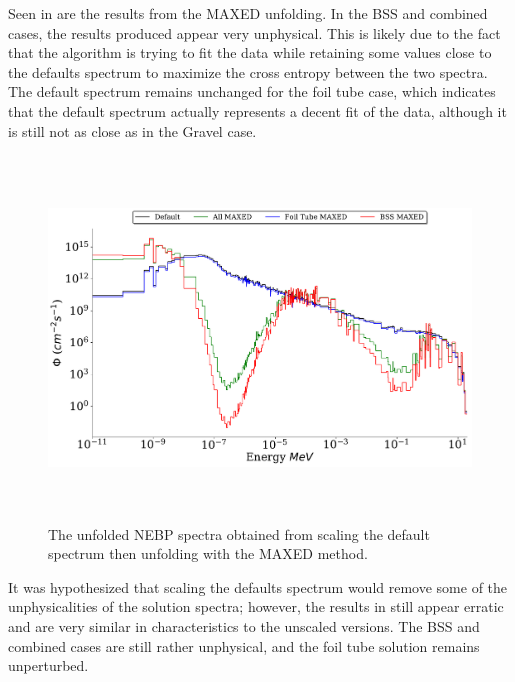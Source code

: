 Seen in  are the results from the MAXED unfolding.
In the BSS and combined cases, the results produced appear very unphysical.
This is likely due to the fact that the algorithm is trying to fit the data while retaining some values close to the defaults spectrum to maximize the cross entropy between the two spectra.
The default spectrum remains unchanged for the foil tube case, which indicates that the default spectrum actually represents a decent fit of the data, although it is still not as close as in the Gravel case.

\begin{figure}[htb]
\includegraphics[height=3.8in]{tex/figures/unfolded_mx_sc.pdf}
\caption[MAXED Unfolded Spectra (Scaled)]{The unfolded NEBP spectra obtained from scaling the default spectrum then unfolding with the MAXED method.}
\label{fig:unfolded_mx_sc}
\end{figure}

It was hypothesized that scaling the defaults spectrum would remove some of the unphysicalities of the solution spectra; however, the results in  still appear erratic and are very similar in characteristics to the unscaled versions.
The BSS and combined cases are still rather unphysical, and the foil tube solution remains unperturbed.

